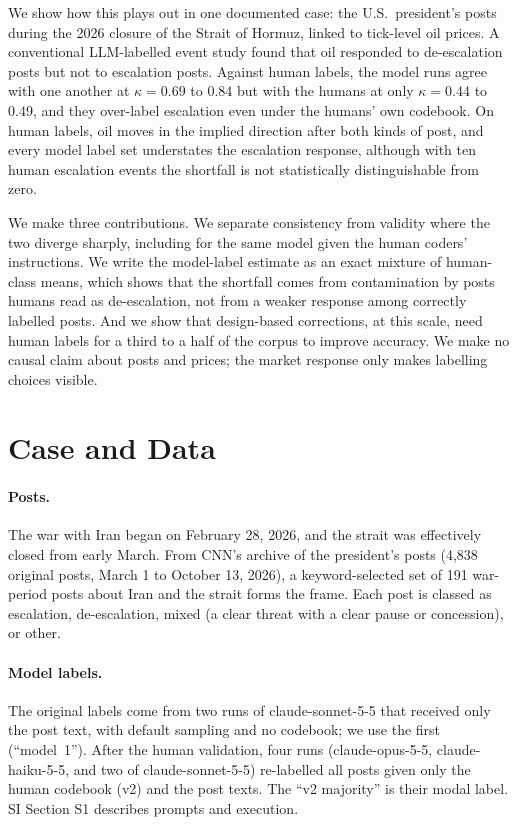 \documentclass[12pt]{article}
\begin{document}
We show how this plays out in one documented case: the U.S.\ president's posts during the 2026 closure of the Strait of Hormuz, linked to tick-level oil prices. A conventional LLM-labelled event study found that oil responded to de-escalation posts but not to escalation posts. Against human labels, the model runs agree with one another at $\kappa = 0.69$ to $0.84$ but with the humans at only $\kappa = 0.44$ to $0.49$, and they over-label escalation even under the humans' own codebook. On human labels, oil moves in the implied direction after both kinds of post, and every model label set understates the escalation response, although with ten human escalation events the shortfall is not statistically distinguishable from zero.

We make three contributions. We separate consistency from validity where the two diverge sharply, including for the same model given the human coders' instructions. We write the model-label estimate as an exact mixture of human-class means, which shows that the shortfall comes from contamination by posts humans read as de-escalation, not from a weaker response among correctly labelled posts. And we show that design-based corrections, at this scale, need human labels for a third to a half of the corpus to improve accuracy. We make no causal claim about posts and prices; the market response only makes labelling choices visible.

\section{Case and Data}

\paragraph{Posts.} The war with Iran began on February 28, 2026, and the strait was effectively closed from early March. From CNN's archive of the president's posts (4,838 original posts, March 1 to October 13, 2026), a keyword-selected set of 191 war-period posts about Iran and the strait forms the frame. Each post is classed as escalation, de-escalation, mixed (a clear threat with a clear pause or concession), or other.

\paragraph{Model labels.} The original labels come from two runs of claude-sonnet-5-5 that received only the post text, with default sampling and no codebook; we use the first (``model~1''). After the human validation, four runs (claude-opus-5-5, claude-haiku-5-5, and two of claude-sonnet-5-5) re-labelled all posts given only the human codebook (v2) and the post texts. The ``v2 majority'' is their modal label. SI Section S1 describes prompts and execution.
\end{document}
